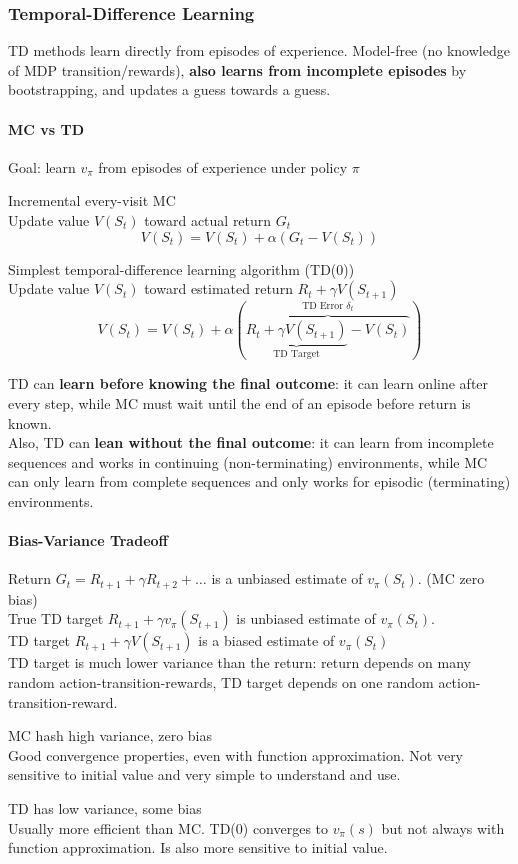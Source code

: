 \documentclass[10pt]{report}
\begin{document}
\subsubsection{Temporal-Difference Learning}
TD methods learn directly from episodes of experience. Model-free (no knowledge of MDP transition/rewards), \textbf{also learns from incomplete episodes} by bootstrapping, and updates a guess towards a guess.
\paragraph{MC vs TD} Goal: learn $v_\pi$ from episodes of experience under policy $\pi$
\begin{list}{}{}
	\item Incremental every-visit MC\\
	Update value $V(S_t)$ toward actual return $G_t$
	$$V(S_t) = V(S_t) +\alpha(G_t-V(S_t))$$
	\item Simplest temporal-difference learning algorithm (TD(0))\\
	Update value $V(S_t)$ toward estimated return $R_t + \gamma V(S_{t+1})$
	$$V(S_t) = V(S_t) + \alpha(\overset{\text{TD Error }\delta_t}{\overbrace{\underset{\text{TD Target}}{\underbrace{R_t+\gamma V(S_{t+1})}} - V(S_t)}})$$
\end{list}
TD can \textbf{learn before knowing the final outcome}: it can learn online after every step, while MC must wait until the end of an episode before return is known.\\
Also, TD can \textbf{lean without the final outcome}: it can learn from incomplete sequences and works in continuing (non-terminating) environments, while MC can only learn from complete sequences and only works for episodic (terminating) environments.
\paragraph{Bias-Variance Tradeoff} Return $G_t = R_{t+1} + \gamma R_{t+2}+\ldots$ is a unbiased estimate of $v_\pi(S_t)$. (MC zero bias)\\
True TD target $R_{t+1} + \gamma v_\pi(S_{t+1})$ is unbiased estimate of $v_\pi(S_t)$.\\
TD target $R_{t+1} + \gamma V(S_{t+1})$ is a biased estimate of $v_\pi(S_t)$\\
TD target is much lower variance than the return: return depends on many random action-transition-rewards, TD target depends on one random action-transition-reward.
\begin{list}{}{}
	\item MC hash high variance, zero bias\\
	Good convergence properties, even with function approximation. Not very sensitive to initial value and very simple to understand and use.
	\item TD has low variance, some bias\\
	Usually more efficient than MC. TD(0) converges to $v_\pi(s)$ but not always with function approximation. Is also more sensitive to initial value.
\end{list}
\end{document}
